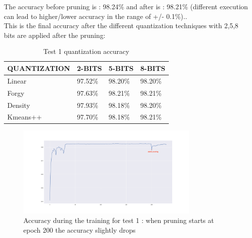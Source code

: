 \documentclass[journal]{vgtc}                %
\begin{document}
The accuracy before pruning is : 98.24\% and after is : 98.21\% (different execution can lead to higher/lower accuracy in the range of +/- 0.1\%)..\\This is the final accuracy after the different quantization techniques with 2,5,8 bits are applied after the pruning:
\begin{table}[H]
\caption{Test 1 quantization accuracy}
\label{my-label}
\begin{tabular}{|l|l|l|l|}
\hline
QUANTIZATION & 2-BITS  & 5-BITS  & 8-BITS  \\ \hline
Linear       & 97.52\% & 98.20\% & 98.20\% \\ \hline
Forgy        & 97.63\% & 98.21\% & 98.21\% \\ \hline
Density       & 97.93\% & 98.18\% & 98.20\% \\ \hline
Kmeans++     & 97.70\% & 98.18\% & 98.21\% \\ \hline
\end{tabular}
\end{table}\begin{figure}[H]
	\hspace*{-1cm}   
	\includegraphics[width=90mm,scale=0.7]{accuracy-soft-threshold}
	\caption{Accuracy during the training for test 1 : when pruning starts at epoch 200 the accuracy slightly drops}
\end{figure}
\end{document}
